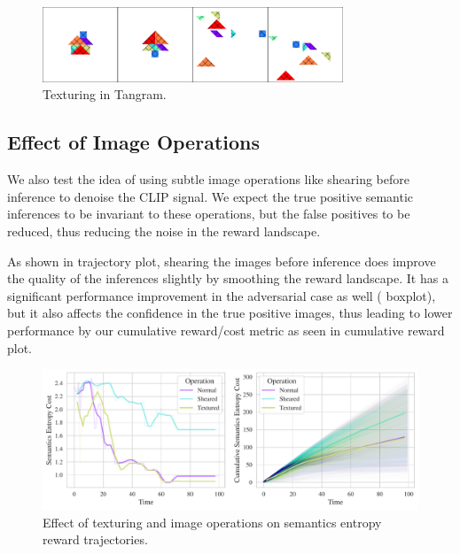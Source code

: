 \begin{figure}[H]
    \centering
    \includegraphics[width=0.8\textwidth]{images/hatched.pdf}
    \caption{Texturing in Tangram.}
    \label{fig:texturing}
\end{figure}

\subsection{Effect of Image Operations}
\label{sec:image-operations}
We also test the idea of using subtle image operations like shearing before inference to denoise the CLIP signal.
We expect the true positive semantic inferences to be invariant to these operations, but the false positives to be reduced, thus reducing the noise in the reward landscape.

As shown in  trajectory plot, shearing the images before inference does improve the quality of the inferences slightly by smoothing the reward landscape.
It has a significant performance improvement in the adversarial case as well ( boxplot), but it also affects the confidence in the true positive images, thus leading to lower performance by our cumulative reward/cost metric as seen in  cumulative reward plot.

\begin{figure}[H]
    \centering
    \includegraphics[width=\textwidth]{images/texturing_operations_comparison.pdf}
    \caption{Effect of texturing and image operations on semantics entropy reward trajectories.}
    \label{fig:texturing-operations}
\end{figure}

